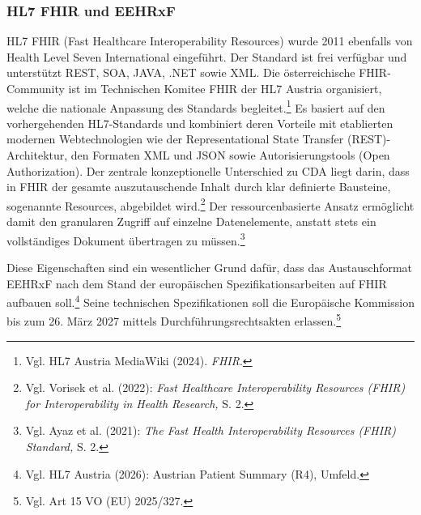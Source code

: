         \subsubsection{HL7 FHIR und EEHRxF}
HL7 FHIR (Fast Healthcare Interoperability Resources) wurde 2011 ebenfalls von Health Level Seven International eingeführt.
Der Standard ist frei verfügbar und unterstützt REST, SOA, JAVA, .NET sowie XML.
Die österreichische FHIR-Community ist im Technischen Komitee FHIR der HL7 Austria organisiert, welche die nationale Anpassung des Standards begleitet.\footnote{Vgl. HL7 Austria MediaWiki (2024). \textit{FHIR}.}
Es basiert auf den vorhergehenden HL7-Standards und kombiniert deren Vorteile mit etablierten modernen Webtechnologien wie der Representational State Transfer (REST)-Architektur, den Formaten XML und JSON sowie Autorisierungstools (Open Authorization). Der zentrale konzeptionelle Unterschied zu CDA liegt darin, dass in FHIR der gesamte auszutauschende Inhalt durch klar definierte Bausteine, sogenannte Resources, abgebildet wird.\footnote{Vgl. Vorisek et al. (2022): \textit{Fast Healthcare Interoperability Resources (FHIR) for Interoperability in Health Research,} S. 2.} Der ressourcenbasierte Ansatz ermöglicht damit den granularen Zugriff auf einzelne Datenelemente, anstatt stets ein vollständiges Dokument übertragen zu müssen.\footnote{Vgl. Ayaz et al. (2021): \textit{The Fast Health Interoperability Resources (FHIR) Standard,} S. 2.}

Diese Eigenschaften sind ein wesentlicher Grund dafür, dass das Austauschformat EEHRxF nach dem Stand der europäischen Spezifikationsarbeiten auf FHIR aufbauen soll.\footnote{Vgl. HL7 Austria (2026): Austrian Patient Summary (R4), Umfeld.} Seine technischen Spezifikationen soll die Europäische Kommission bis zum 26. März 2027 mittels Durchführungsrechtsakten erlassen.\footnote{Vgl. Art 15 VO (EU) 2025/327.}


